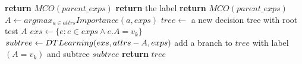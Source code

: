 \documentclass{standalone}
\begin{document}
\begin{varwidth}{\linewidth}
\par\noindent
 \begin{algorithmic}
\Statex
     \textbf{return} $MCO(parent\_exps)$
     \textbf{return} the label
     \textbf{return} $MCO(parent\_exps)$
 \Else
   \State $A \gets argmax_{a \in attrs} Importance(a,exps)$
   \State $tree \gets$ a new decision tree with root test $A$
     \State $exs \gets \{e: e \in exps \land e.A=v_k\}$
     \State $subtree \gets DT\-Learning(exs,attrs-A,exps)$
     \State add a branch to $tree$ with label $(A=v_k)$ and subtree $subtree$   
   \EndFor
 \EndIf
 \State \textbf{return} $tree$
 \EndProcedure
 \end{algorithmic}
\end{varwidth}
\end{document}
